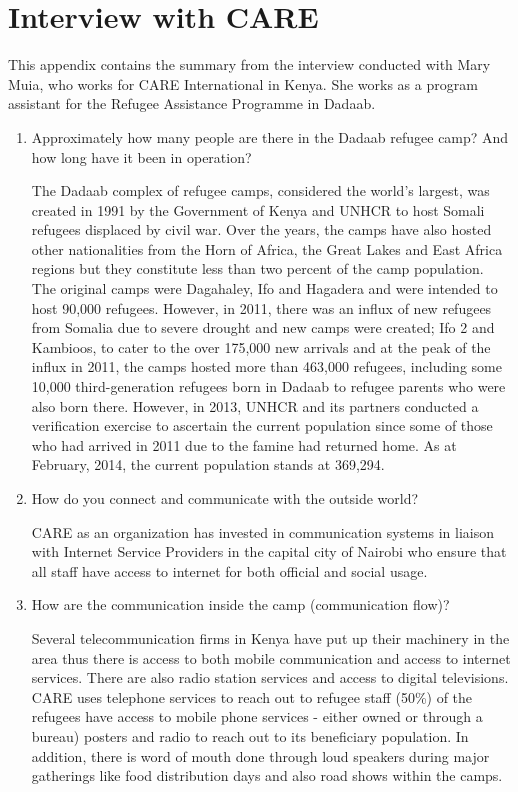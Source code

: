 \chapter{Interview with CARE}
\label{chp:appendixA} 

This appendix contains the summary from the interview conducted with Mary Muia, who works for CARE International in Kenya. She works as a program assistant for the Refugee Assistance Programme in Dadaab.


\begin{enumerate}

\item Approximately how many people are there in the Dadaab refugee camp? And how long have it been in operation?

The Dadaab complex of refugee camps, considered the world’s largest, was created in 1991 by the Government of Kenya and UNHCR to host Somali refugees displaced by civil war. Over the years, the camps have also hosted other nationalities from the Horn of Africa, the Great Lakes and East Africa regions but they constitute less than two percent of the camp population. The original camps were Dagahaley, Ifo and Hagadera and were intended to host 90,000 refugees. However, in 2011, there was an influx of new refugees from Somalia due to severe drought and new camps were created; Ifo 2 and Kambioos, to cater to the over 175,000 new arrivals and at the peak of the influx in 2011, the camps hosted more than 463,000 refugees, including some 10,000 third-generation refugees born in Dadaab to refugee parents who were also born there. However, in 2013, UNHCR and its partners conducted a verification exercise to ascertain the current population since some of those who had arrived in 2011 due to the famine had returned home. As at February, 2014, the current population stands at 369,294.

\item How do you connect and communicate with the outside world?

CARE as an organization has invested in communication systems in liaison with Internet Service Providers in the capital city of Nairobi who ensure that all staff have access to internet for both official and social usage.

\item How are the communication inside the camp (communication flow)?

Several telecommunication firms in Kenya have put up their machinery in the area thus there is access to both mobile communication and access to internet services. There are also radio station services and access to digital televisions. CARE uses telephone services to reach out to refugee staff (50\%) of the refugees have access to mobile phone services - either owned or through a bureau) posters and radio to reach out to its beneficiary population. In addition, there is word of mouth done through loud speakers during major gatherings like food distribution days and also road shows within the camps.



\end{enumerate}
